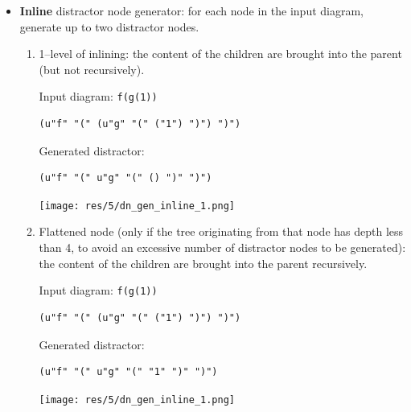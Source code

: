 \begin{chapterBody}
\begin{itemize}
\begin{minipage}{.45\linewidth}
Input diagram: \texttt{f(1)}
\begin{lstlisting}[language=etl]
(u"f" "(" ("1") ")")
\end{lstlisting}
Generated distractors:
\begin{lstlisting}[language=etl]
(() "(" () ")")
(u"f")
\end{lstlisting}
\end{minipage}
\hspace{.1\linewidth}
\begin{minipage}{.4\linewidth}
\texttt{[image: res/5/dn\_gen\_extract.png]}
\end{minipage}

    \item \textbf{Inline} distractor node generator: for each node in the
input diagram, generate up to two distractor nodes.
\begin{enumerate}
    \item 1–level of inlining: the content of the children are brought into the
parent (but not recursively).

\begin{minipage}{.45\linewidth}
Input diagram: \texttt{f(g(1))}
\begin{lstlisting}[language=etl]
(u"f" "(" (u"g" "(" ("1") ")") ")")
\end{lstlisting}
Generated distractor:
\begin{lstlisting}[language=etl]
(u"f" "(" u"g" "(" () ")" ")")
\end{lstlisting}
\end{minipage}
\hspace{.1\linewidth}
\begin{minipage}{.4\linewidth}
\texttt{[image: res/5/dn\_gen\_inline\_1.png]}
\end{minipage}

    \item Flattened node (only if the tree originating from that node has depth
less than 4, to avoid an excessive number of distractor nodes to be generated):
the content of the children are brought into the parent recursively.

\begin{minipage}{.45\linewidth}
Input diagram: \texttt{f(g(1))}
\begin{lstlisting}[language=etl]
(u"f" "(" (u"g" "(" ("1") ")") ")")
\end{lstlisting}
Generated distractor:
\begin{lstlisting}[language=etl]
(u"f" "(" u"g" "(" "1" ")" ")")
\end{lstlisting}
\end{minipage}
\hspace{.1\linewidth}
\begin{minipage}{.4\linewidth}
\texttt{[image: res/5/dn\_gen\_inline\_1.png]}
\end{minipage}


\end{enumerate}
\end{itemize}
\end{chapterBody}
